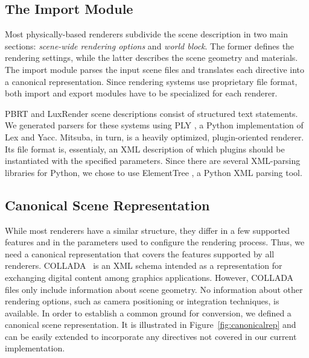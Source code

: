 \subsection{The Import Module}
Most physically-based renderers subdivide the scene description in two main sections:
{\it scene-wide rendering options} and {\it world block}. The former defines the rendering settings, while the latter describes the scene geometry and materials.
%
The import module parses the input scene files and translates each directive into a canonical
representation. Since rendering systems use proprietary file format, both import and export modules have to be specialized for each renderer.

PBRT and LuxRender scene descriptions consist of structured text statements. We generated parsers for these systems using 
PLY \cite{ply}, a Python implementation of Lex and Yacc.
%
Mitsuba, in turn, is a heavily optimized, plugin-oriented renderer. Its file
format is, essentialy, an XML description of which plugins should be instantiated
with the specified parameters. Since there are several XML-parsing libraries for Python,
we chose to use ElementTree \cite{ET}, a Python XML parsing tool.

\subsection{Canonical Scene Representation}
While most renderers have a similar structure, they differ in a few supported features and in the parameters used to configure the rendering process. Thus, we need a canonical representation that covers the features supported by all renderers. 
%
 COLLADA~\cite{collada} is an XML schema intended as a representation for exchanging digital content among graphics applications. 
 However, COLLADA files only include information about scene geometry. No information about other rendering 
 options, such as camera positioning or integration techniques, is available. 
 In order to establish a common ground for conversion, we defined a canonical scene representation. It 
 is illustrated in Figure~\ref{fig:canonicalrep} and can be easily extended to incorporate any directives not covered in our current implementation.
 
